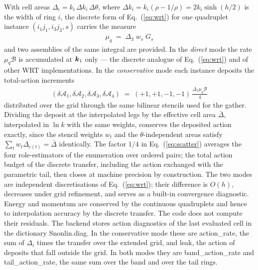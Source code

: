 \documentclass[12pt]{article}
\newcommand{\beq}  { \begin{eqnarray} }
\newcommand{\eeq}  { \end{eqnarray}}
\newcommand{\eq }  [1]{Eq.~(\ref{#1})}  %
\renewcommand{\v}[1]{{\mbox{\boldmath$ #1 $}}}  %
\newcommand{\lk}{\left(}
\newcommand{\rk}{\right)}
\begin{document}
With cell areas $\Delta_i = k_i\, \Delta k_i \, \Delta\theta$, where
$\Delta k_i = k_i \lk \rho - 1/\rho \rk = 2 k_i \sinh(h/2)$ is the width of
ring $i$, the discrete form of
\eq{eq:wrt} for one quadruplet instance $(i_1 j_1, i_3 j_3, s)$ carries the
measure
\beq
 \mu_q \;=\; \Delta_{3}\; w_s \; G_s
\eeq
and two assemblies of the same integral are provided.
In the \emph{direct} mode the rate $\mu_q \mathcal{B}$ is accumulated at
$\v k_1$ only --- the discrete analogue of \eq{eq:wrt} and of other WRT
implementations.
In the \emph{conservative} mode each instance deposits the total-action
increments
\beq \label{eq:scatter}
 \lk \delta \mathcal{A}_1, \delta \mathcal{A}_2,
     \delta \mathcal{A}_3, \delta \mathcal{A}_4 \rk
 \;=\; \lk +1,+1,-1,-1 \rk \, \frac{\Delta_1 \mu_q \mathcal{B}}{4}
\eeq
distributed over the grid through the same bilinear stencils used for the
gather.
Dividing the deposit at the interpolated legs by the effective cell area
$\bar\Delta$, interpolated in $\ln k$ with the same weights, conserves the
deposited action exactly, since the stencil weights $w_t$ and the
$\theta$-independent areas satisfy $\sum_t w_t \Delta_{c(t)} = \bar\Delta$
identically.
The factor $1/4$ in \eq{eq:scatter} averages the four role-estimators of the
enumeration over ordered pairs; the total action budget of the discrete
transfer, including the action exchanged with the parametric tail, then
closes at machine precision by construction.
The two modes are independent discretisations of \eq{eq:wrt}; their
difference is $O(h)$, decreases under grid refinement, and serves as a
built-in convergence diagnostic.
Energy and momentum are conserved by the continuous quadruplets and hence to
interpolation accuracy by the discrete transfer.
The code does not compute their residuals.
The backend stores action diagnostics of the last evaluated cell in the
dictionary Snonlin.diag.
In the conservative mode these are action\_rate, the sum of $\Delta_i$
times the transfer over the extended grid, and leak, the action of deposits
that fall outside the grid.
In both modes they are band\_action\_rate and tail\_action\_rate, the same
sum over the band and over the tail rings.
\end{document}

